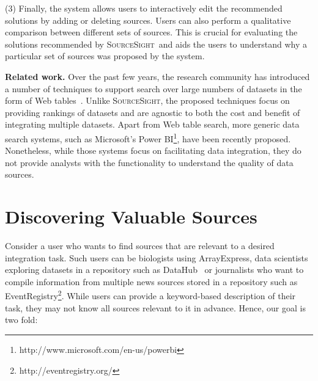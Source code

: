 \documentclass{vldb}
\newcommand\system{\textsc{SourceSight}}
\begin{document}
\vspace{2pt}\noindent (3) Finally, the system allows users to interactively edit the recommended solutions by adding or deleting sources. Users can also perform a qualitative comparison between different sets of sources. This is crucial for evaluating the solutions recommended by \system~and aids the users to understand why a particular set of sources was proposed by the system.

\noindent\textbf{Related work.} Over the past few years, the research community has introduced a number of techniques to support search over large numbers of datasets in the form of Web tables~\cite{limaye:2010,dassarma:2012,yakout:2012}. Unlike \system, the proposed techniques focus on providing rankings of datasets and are agnostic to both the cost and benefit of integrating multiple datasets. Apart from Web table search, more generic data search systems, such as Microsoft's Power BI\footnote{http://www.microsoft.com/en-us/powerbi}, have been recently proposed. Nonetheless, while those systems focus on facilitating data integration, they do not provide analysts with the functionality to understand the quality of data sources.


\section{Discovering Valuable Sources}
\label{sec:sources}
Consider a user who wants to find sources that are relevant to a desired integration task. Such users can be biologists using ArrayExpress, data scientists exploring datasets in a repository such as DataHub~\cite{datahub} or journalists who want to compile information from multiple news sources stored in a repository such as EventRegistry\footnote{http://eventregistry.org/}. While users can provide a keyword-based description of their task, they may not know all sources relevant to it in advance. Hence, our goal is two fold: 
\end{document}
